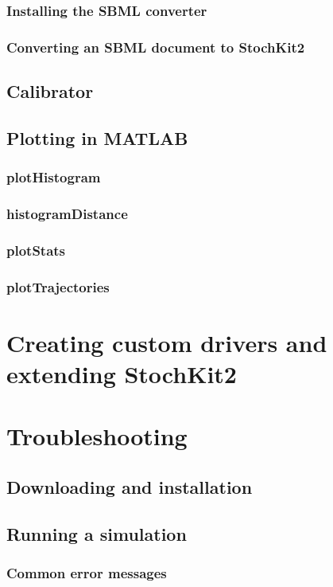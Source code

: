 \documentclass[11pt,letterpaper]{article}
\begin{document}
\subsubsection{Installing the SBML converter}
\subsubsection{Converting an SBML document to StochKit2}
\subsection{Calibrator}
\subsection{Plotting in MATLAB}
\subsubsection{plotHistogram}
\subsubsection{histogramDistance}
\subsubsection{plotStats}
\subsubsection{plotTrajectories}

\section{Creating custom drivers and extending StochKit2}

\section{Troubleshooting}
\subsection{Downloading and installation}
\subsection{Running a simulation}
\subsubsection{Common error messages}
\end{document}
